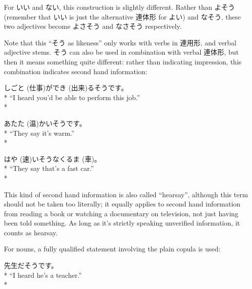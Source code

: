 \documentclass[11pt, b5paper, twoside, openright, onecolumn]{book}
\makeatletter
\newcommand*{\rubystack}[2]{{\relscale{0.5}%
  \begin{tabular}[b]{@{}c@{}}%
    {#1}\\%
   {\textscale{2}{#2}}%
  \end{tabular}}%
}
\DeclareRobustCommand*{\ruby}[2]{%
  \mbox{%
    \setlength{\parskip}{0ex}%
    \BeginAccSupp{method=pdfstringdef,ActualText={#1}}%
      \rubystack{\phantom{#2}}{#1}%
      \llap{%
        \rubystack{#2}{\phantom{#1}}%
      }%
    \EndAccSupp{}%
  }%
}
\renewcommand*{\ruby}[2]{#2 (#1)}%
\newenvironment{exampleblock}{
\setlength{\parindent}{0.6in}
\begin{minipage}[t]{\dimexpr\textwidth-\parindent}}
{\end{minipage}}
\makeatother
\begin{document}
For いい and ない‚ this construction is slightly different. Rather than よそう (remember that いい is just the alternative 連体形 for よい) and なそう‚ these two adjectives become よさそう and なさそう respectively.

Note that this “そう as likeness” only works with verbs in 連用形‚ and verbal adjective stems. そう can also be used in combination with verbal 連体形‚ but then it means something quite different: rather than indicating impression‚ this combination indicates second hand information:

\vspace{0.4cm}
\begin{exampleblock}
\ruby{仕事}{しごと}が\ruby{出来}{でき}るそうです。 \\* 
“I heard you’d be able to perform this job.” \\* 
\end{exampleblock}
\vspace{0.2cm}

\begin{exampleblock}
\ruby{温}{あたた}かいそうです。 \\* 
“They say it’s warm.” \\* 
\end{exampleblock}
\vspace{0.2cm}

\begin{exampleblock}
\ruby{速}{はや}いそうな\ruby{車}{くるま}。 \\* 
“They say that’s a fast car.” \\* 
\end{exampleblock}
\vspace{0.2cm}

This kind of second hand information is also called “hearsay”‚ although this term should not be taken too literally; it equally applies to second hand information from reading a book or watching a documentary on television‚ not just having been told something. As long as it’s strictly speaking unverified information‚ it counts as hearsay.

For nouns‚ a fully qualified statement involving the plain copula is used:

\vspace{0.4cm}
\begin{exampleblock}
先生だそうです。 \\* 
“I heard he’s a teacher.” \\* 
\end{exampleblock}
\end{document}

